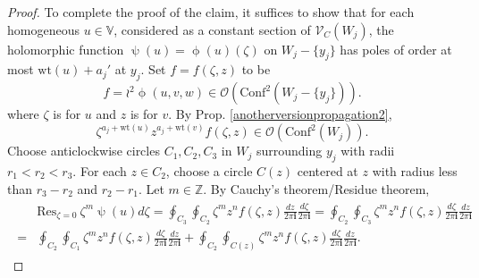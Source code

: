 \documentclass[11pt,b5paper,notitlepage]{article}
\theoremstyle{definition}
\theoremstyle{plain}
\newcommand{\Conf}{\mathrm{Conf}}
\newcommand{\Res}{\mathrm{Res}}
\newcommand{\SV}{\mathscr{V}}
\newcommand{\im}{\mathbf{i}}
\newcommand{\Vbb}{\mathbb V}
\newcommand{\Zbb}{\mathbb Z}
\newcommand{\wt}{\mathrm{wt}}
\newcommand{\<}{\left\langle}
\renewcommand{\>}{\right\rangle}
\newcommand{\MO}{\mathcal{O}}
\numberwithin{equation}{subsection}
\begin{document}
\begin{proof}
     


 
To complete the proof of the claim, it suffices to show that for each homogeneous $u\in \Vbb$, considered as a constant section of $\SV_C(W_j)$, the holomorphic function $\uppsi(u)=\upphi(u)(\zeta)$ on $W_j-\{y_j\}$ has poles of order at most $\wt(u)+a_j'$ at $y_j$. Set $f=f(\zeta,z)$ to be 
        $$
        f=\wr^2\upphi(u,v,w)\in \MO(\Conf^2(W_j-\{y_j\})).
        $$
where $\zeta$ is for $u$ and $z$ is for $v$.      By Prop. \ref{anotherversionpropagation2}, 
        \begin{equation}\label{proofpole}
            \zeta^{a_j+\wt(u)}z^{a_j+\wt(v)}f(\zeta,z)\in \MO(\Conf^2(W_j)).
        \end{equation}
Choose anticlockwise circles $C_1,C_2,C_3$ in $W_j$ surrounding $y_j$ with radii $r_1<r_2<r_3$. For each $z\in C_2$, choose a circle $C(z)$ centered at $z$ with radius less than $r_3-r_2$ and $r_2-r_1$. Let $m\in \Zbb$. By Cauchy's theorem/Residue theorem, 
        \begin{align}\label{proofpole2}
            \begin{aligned}
       & \Res_{\zeta=0}~\zeta^m\uppsi(u)d\zeta=\oint_{C_3}\oint_{C_2}\zeta^m z^n f(\zeta,z)\frac{dz}{2\pi\im} \frac{d\zeta}{2\pi\im}=\oint_{C_2}\oint_{C_3}\zeta^m z^n f(\zeta,z)\frac{d\zeta}{2\pi\im} \frac{dz}{2\pi\im} \\
        =&\oint_{C_2}\oint_{C_1}\zeta^m z^n f(\zeta,z)\frac{d\zeta}{2\pi\im} \frac{dz}{2\pi\im} +\oint_{C_2}\oint_{C(z)}\zeta^m z^n f(\zeta,z)\frac{d\zeta}{2\pi\im} \frac{dz}{2\pi\im}.
        \end{aligned}
        \end{align}


\end{proof}
\end{document}
